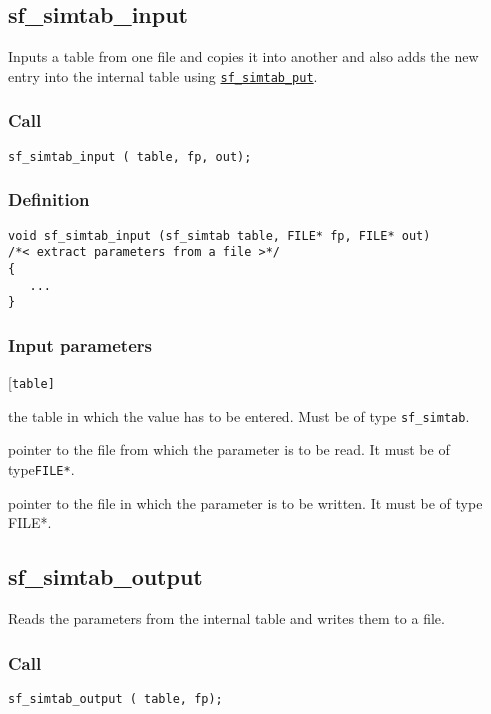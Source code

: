 \subsection{{sf\_simtab\_input}}\label{sec:sf_simtab_input}
Inputs a table from one file and copies it into another and also adds the new entry into the internal table using \hyperref[sec:sf_simtab_put]{\texttt{sf\_simtab\_put}}.

\subsubsection*{Call}
\begin{verbatim}sf_simtab_input ( table, fp, out);\end{verbatim}

\subsubsection*{Definition}
\begin{verbatim}
void sf_simtab_input (sf_simtab table, FILE* fp, FILE* out) 
/*< extract parameters from a file >*/
{
   ...
}
\end{verbatim}

\subsubsection*{Input parameters}
\begin{desclist}{\tt }{\quad}[\tt table]
   \setlength\itemsep{0pt}
   \item[table] the table in which the value has to be entered. Must be of type \texttt{sf\_simtab}. 
   \item[fp]    pointer to the file from which the parameter is to be read. It must be of type\texttt{FILE*}.
   \item[out]   pointer to the file in which the parameter is to be written. It must be of type FILE*.
\end{desclist}




\subsection{{sf\_simtab\_output}}\label{sec:sf_simtab_output}
Reads the parameters from the internal table and writes them to a file.

\subsubsection*{Call}
\begin{verbatim}sf_simtab_output ( table, fp);\end{verbatim}

